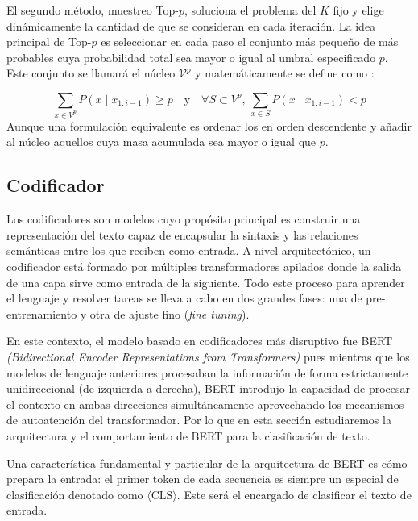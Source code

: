 El segundo método, muestreo Top-$p$, soluciona el problema del ${K}$ fijo y elige 
dinámicamente la cantidad de \tokens{} que se consideran en cada iteración. 
La idea principal de Top-$p$ es seleccionar en cada paso el conjunto más pequeño 
de \tokens más probables cuya probabilidad total sea mayor o igual al umbral 
especificado $p$. Este conjunto se llamará el núcleo $\mathcal{V}^p$ y  
matemáticamente se define como :

\begin{equation}
    \sum_{x \in V^{p}} P(x \mid x_{1:i-1}) \geq p \quad \text{y} \quad \forall S \subset V^{p}, \, \sum_{x \in S} P(x \mid x_{1:i-1}) < p
\end{equation}
Aunque una formulación equivalente es ordenar los \tokens en orden descendente  y añadir al núcleo aquellos cuya masa acumulada sea mayor o igual que $p$.
\subsection{Codificador}

Los codificadores son modelos cuyo propósito principal es construir una representación del texto capaz de encapsular la sintaxis y las relaciones semánticas entre los \tokens{} que reciben como entrada. A nivel arquitectónico, un codificador está formado por múltiples transformadores apilados donde la salida de una capa sirve como entrada de la siguiente. Todo este proceso para aprender el lenguaje y resolver tareas se lleva a cabo en dos grandes fases: una de pre-entrenamiento y otra de ajuste fino (\textit{fine tuning}).

En este contexto, el modelo basado en codificadores más disruptivo fue BERT \textit{(Bidirectional Encoder Representations from Transformers)} pues mientras que los modelos de lenguaje anteriores procesaban la información de forma estrictamente unidireccional (de izquierda a derecha), BERT introdujo la capacidad de procesar el contexto en ambas direcciones simultáneamente aprovechando los mecanismos de autoatención del transformador. Por lo que en esta sección estudiaremos la arquitectura y el comportamiento de BERT para la clasificación de texto.

Una característica fundamental y particular de la arquitectura de BERT es cómo prepara la entrada: el primer token de cada secuencia es siempre un \token{} especial de clasificación denotado como $\langle \text{CLS} \rangle$. Este \token{} será el encargado de clasificar el texto de entrada.

